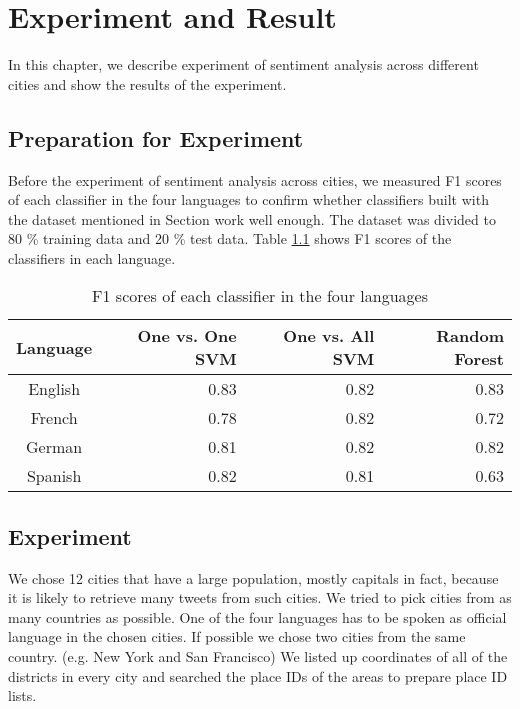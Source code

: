 \chapter{Experiment and Result}
In this chapter, we describe experiment of sentiment analysis across different cities and show the results of the experiment.
\section{Preparation for Experiment}
Before the experiment of sentiment analysis across cities, we measured F1 scores of each classifier in the four languages to confirm whether classifiers built with the dataset mentioned in Section \label{sec:dataset} work well enough.
The dataset was divided to 80 \% training data and 20 \% test data.
Table \ref{tab:f1score} shows F1 scores of the classifiers in each language.


\begin{table}[ht]
	\caption{F1 scores of each classifier in the four languages}
	\begin{tabular}{|c|r|r|r|} \hline
	Language&One vs. One SVM &One vs. All SVM &Random Forest\\ \hline \hline
	English & 0.83 & 0.82 & 0.83  \\ \hline
	French & 0.78 & 0.82 & 0.72  \\ \hline
	German & 0.81 & 0.82 & 0.82 \\ \hline
	Spanish & 0.82 & 0.81 & 0.63  \\ \hline
	\end{tabular}
	\label{tab:f1score}
\end{table}

\section{Experiment}\label{sec:experiment}

We chose 12 cities that have a large population, mostly capitals in fact, because it is likely to retrieve many tweets from such cities.
We tried to pick cities from as many countries as possible.
One of the four languages has to be spoken as official language in the chosen cities.
If possible we chose two cities from the same country. (e.g. New York and San Francisco)
We listed up coordinates of all of the districts in every city and searched the place IDs of the areas to prepare place ID lists.

